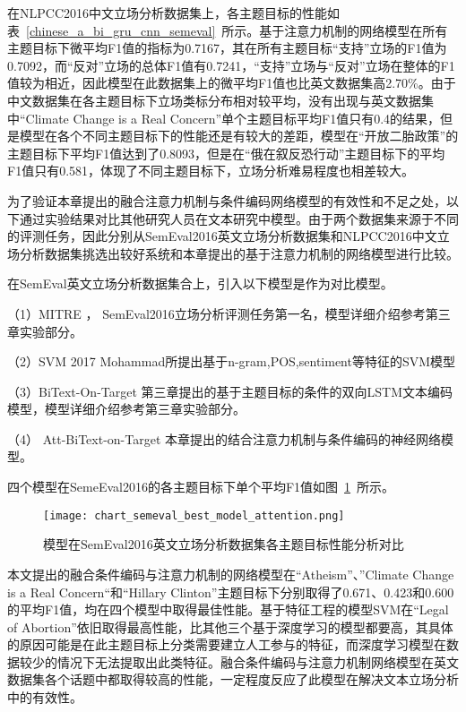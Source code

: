 在NLPCC2016中文立场分析数据集上，各主题目标的性能如表~\ref{chinese_a_bi_gru_cnn_semeval}~所示。基于注意力机制的网络模型在所有主题目标下微平均F1值的指标为0.7167，其在所有主题目标“支持”立场的F1值为0.7092，而“反对”立场的总体F1值有0.7241，“支持”立场与“反对”立场在整体的F1值较为相近，因此模型在此数据集上的微平均F1值也比英文数据集高2.70\%。由于中文数据集在各主题目标下立场类标分布相对较平均，没有出现与英文数据集中“Climate Change is a Real Concern”单个主题目标平均F1值只有0.4的结果，但是模型在各个不同主题目标下的性能还是有较大的差距，模型在“开放二胎政策”的主题目标下平均F1值达到了0.8093，但是在“俄在叙反恐行动”主题目标下的平均F1值只有0.581，体现了不同主题目标下，立场分析难易程度也相差较大。

为了验证本章提出的融合注意力机制与条件编码网络模型的有效性和不足之处，以下通过实验结果对比其他研究人员在文本研究中模型。由于两个数据集来源于不同的评测任务，因此分别从SemEval2016英文立场分析数据集和NLPCC2016中文立场分析数据集挑选出较好系统和本章提出的基于注意力机制的网络模型进行比较。

在SemEval英文立场分析数据集合上，引入以下模型是作为对比模型。

（1）MITRE ， SemEval2016立场分析评测任务第一名，模型详细介绍参考第三章实验部分。

（2）SVM   2017 Mohammad所提出基于n-gram,POS,sentiment等特征的SVM模型

（3）BiText-On-Target 第三章提出的基于主题目标的条件的双向LSTM文本编码模型，模型详细介绍参考第三章实验部分。

（4） Att-BiText-on-Target 本章提出的结合注意力机制与条件编码的神经网络模型。

四个模型在SemeEval2016的各主题目标下单个平均F1值如图~\ref{chart_semeval_best_model_attention}~所示。
\begin{figure}[htbp]
	\centering
	\texttt{[image: chart\_semeval\_best\_model\_attention.png]}
	\caption[rnn_vanish]{模型在SemEval2016英文立场分析数据集各主题目标性能分析对比}
	\label{chart_semeval_best_model_attention}
\end{figure}

本文提出的融合条件编码与注意力机制的网络模型在“Atheism”、”Climate Change is a Real Concern“和“Hillary Clinton”主题目标下分别取得了0.671、0.423和0.600的平均F1值，均在四个模型中取得最佳性能。基于特征工程的模型SVM在“Legal of Abortion”依旧取得最高性能，比其他三个基于深度学习的模型都要高，其具体的原因可能是在此主题目标上分类需要建立人工参与的特征，而深度学习模型在数据较少的情况下无法提取出此类特征。融合条件编码与注意力机制网络模型在英文数据集各个话题中都取得较高的性能，一定程度反应了此模型在解决文本立场分析中的有效性。

